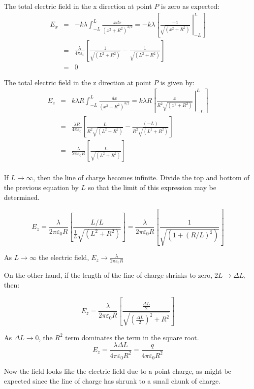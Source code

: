 \documentclass[12pt]{article}
\begin{document}
The total electric field in the x direction at point $P$ is zero as expected:
\begin{eqnarray*}
E_{x} & = & -k\lambda \int_{-L}^{L} \frac{xdx}{(x^{2}+R^{2})^{3/2}}
=-k\lambda \left[ \left. \frac{-1}{\sqrt{(x^{2}+R^{2})}} \:  \right\vert_{-L}^{L}  \right] \\
   & = & \frac{\lambda}{4\pi \varepsilon_{0}}\left[ \frac{1}{\sqrt{(L^{2}+R^{2})}}-\frac{1}{\sqrt{(L^{2}+R^{2})}}\right] \\
   & = & 0
\end{eqnarray*}
 
The total electric field in the z direction at point $P$ is given by:
\begin{eqnarray*}
E_{z} & = & k\lambda R \int_{-L}^{L} \frac{dx}{(x^{2}+R^{2})^{3/2}}
=k\lambda R \left[ \left. \frac{x}{R^{2}\sqrt{(x^{2}+R^{2})}} \:  \right\vert_{-L}^{L}  \right] \\
   & = & \frac{\lambda R}{4\pi \varepsilon_{0}}\left[ \frac{L}{R^{2}\sqrt{(L^{2}+R^{2})}}-\frac{(-L)}{R^{2}\sqrt{(L^{2}+R^{2})}}\right] \\
   & = & \frac{\lambda}{2\pi \varepsilon_{0} R}\left[ \frac{L}{\sqrt{(L^{2}+R^{2})}} \right] \\
\end{eqnarray*}

If $L\rightarrow \infty$, then the line of charge becomes infinite.  Divide the top and bottom of the previous equation by $L$ so that the limit of this 
expression may be determined.

\[
E_{z} = \frac{\lambda}{2\pi \varepsilon_{0} R}\left[ \frac{L/L}{\frac{1}{L}\sqrt{(L^{2}+R^{2})}} \right] = \frac{\lambda}{2\pi \varepsilon_{0} R}\left[ \frac{1}{\sqrt{(1+(R/L)^{2})}} \right]
\]

As $L\rightarrow \infty$ the electric field, $E_{z}\rightarrow \frac{\lambda}{2\pi \varepsilon_{0} R}$

On the other hand, if the length of the line of charge shrinks to zero, 
$2L\rightarrow \Delta L$, then:

\[
E_{z} = \frac{\lambda}{2\pi \varepsilon_{0} R}
\left[ 
\frac{\frac{\Delta L}{2}}{ \sqrt{ (\frac{\Delta L}{2})^{2}+R^{2}} }
\right]
\]

As $\Delta L\rightarrow 0$, the $R^{2}$ term dominates the term in the 
square root.
\[
E_{z} = \frac{\lambda \Delta L }{4\pi \varepsilon_{0} R^{2}}=\frac{q}{4\pi \varepsilon_{0} R^{2}}
\]

Now the field looks like the electric field due to a point charge, as might be expected since the line of charge has shrunk to a small chunk of charge.
\end{document}
